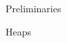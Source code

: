 \documentclass[11pt]{amsart}
\theoremstyle{definition}
\numberwithin{equation}{section}
\newcommand{\C}{\widetilde{C}}
\renewcommand{\(}{\left(}
\renewcommand{\)}{\right)}
\DeclareMathOperator{\FC}{FC}
\newcommand\xxaxis{0}
\newcommand\yyaxis{90}
\newcommand\heapblock[3]{\fill[draw=black, fill=gray!30, rounded corners, line width=1.1pt, shift={(\xxaxis:#1)},shift={(\yyaxis:#2)}] (-1,-0.5) rectangle (1,0.5);\node at (#1,#2) {$#3$};}
\newcommand\heapblank[2]{\fill[fill=white, dotted, draw=black, line width=1.1pt, rounded corners, shift={(\xxaxis:#1)},shift={(\yyaxis:#2)}] (-1,-0.5) rectangle (1,0.5);}
\begin{document}
\begin{section}{Preliminaries}
\begin{subsection}{Heaps}

\end{subsection}
\end{section}
\end{document}

